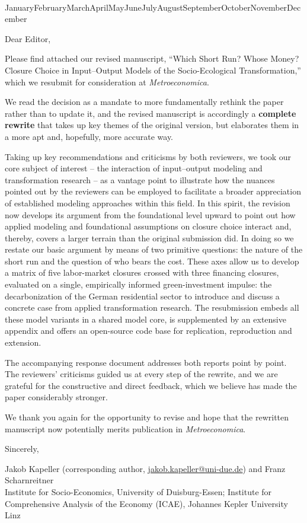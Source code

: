 \documentclass[11pt]{article}
\renewcommand{\today}{~%
  \ifcase \month
    \or January\or February\or March\or April\or May\or June\or July\or August\or September\or October\or November\or December\fi\space\number \year}
\begin{document}
\hfill\today

\bigskip
\noindent Dear Editor,

\medskip

Please find attached our revised manuscript, ``Which Short Run? Whose Money?
Closure Choice in Input--Output Models of the Socio-Ecological Transformation,''
which we resubmit for consideration at \textit{Metroeconomica}.

We read the decision as a mandate to more fundamentally rethink the paper rather than to update it, and the revised manuscript is accordingly a \textbf{complete rewrite} that takes up key themes of the original version, but elaborates them in a more apt and, hopefully, more accurate way.

Taking up key recommendations and criticisms by both reviewers, we took our core subject of interest -- the interaction of input--output modeling and transformation research -- as a vantage point to illustrate how the nuances pointed out by the reviewers can be employed to facilitate a broader appreciation of established modeling approaches within this field. In this spirit, the revision now develops its argument from the foundational level upward to point out how applied modeling and foundational assumptions on closure choice interact and, thereby, covers a larger terrain than the original submission did. In doing so we restate our basic argument by means of two primitive questions: the nature of the short run and the question of who bears the cost. These axes allow us to develop a matrix of five labor-market closures crossed with three financing closures, evaluated on a single, empirically informed green-investment impulse: the decarbonization of the German residential sector to introduce and discuss a concrete case from applied transformation research. The resubmission embeds all these model variants in a shared model core, is supplemented by an extensive appendix and offers an open-source code base for replication, reproduction and extension.

The accompanying response document addresses both reports point by point. The reviewers' criticisms guided us at every step of the rewrite, and we are grateful for the constructive and direct feedback, which we believe has made the paper considerably stronger.

We thank you again for the opportunity to revise and hope that the rewritten
manuscript now potentially merits publication in \textit{Metroeconomica}.

\bigskip
\noindent Sincerely,

\medskip
\noindent Jakob Kapeller (corresponding author,
\href{mailto:jakob.kapeller@uni-due.de}{jakob.kapeller@uni-due.de})
and Franz Scharnreitner\\
Institute for Socio-Economics, University of Duisburg-Essen; Institute for
Comprehensive Analysis of the Economy (ICAE), Johannes Kepler University Linz
\end{document}
